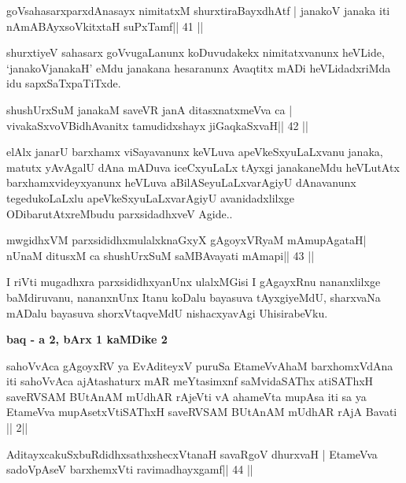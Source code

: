 \begin{shl}
goVsahasarxparxdAnasayx nimitatxM shurxtiraBayxdhAtf |
janakoV janaka iti nAmABAyxsoVkitxtaH suPxTamf\hfill || 41 ||
\end{shl}

\begin{artha}
shurxtiyeV sahasarx goVvugaLanunx koDuvudakekx nimitatxvanunx heVLide, 
`janakoVjanakaH' eMdu janakana hesaranunx Avaqtitx mADi heVLidadxriMda idu sapxSaTxpaTiTxde.
\end{artha}

\begin{shl}
shushUrxSuM janakaM saveVR janA ditasxnatxmeVva ca |
vivakaSxvoV\s BidhAvanitx tamudidxshayx jiGaqkaSxvaH\hfill || 42 ||
\end{shl}

\begin{artha}
elAlx janarU barxhamx viSayavanunx keVLuva apeVkeSxyuLaLxvanu janaka, matutx yAvAgalU dAna mADuva iceCxyuLaLx tAyxgi janakaneMdu heVLutAtx barxhamxvideyxyanunx heVLuva aBilASeyuLaLxvarAgiyU dAnavanunx tegedukoLaLxlu apeVkeSxyuLaLxvarAgiyU avanidadxlilxge ODibarutAtxreMbudu parxsidadhxveV Agide..
\end{artha}

\begin{shl}
mwgidhxVM parxsididhxmulalxknaGxyX gAgoyxVR\s yaM mAmupAgataH|
nUnaM ditusxM ca shushUrxSuM saMBAvayati mAmapi\hfill || 43 ||
\end{shl}

\begin{artha}
I riVti mugadhxra parxsididhxyanUnx ulalxMGisi I gAgayxRnu nananxlilxge baMdiruvanu, nananxnUnx Itanu koDalu bayasuva tAyxgiyeMdU, sharxvaNa mADalu bayasuva shorxVtaqveMdU nishacxyavAgi UhisirabeVku.
\end{artha}

\begin{center}
{\bf baq - a 2, bArx 1 kaMDike 2}
\end{center}

\begin{shl}
sahoVvAca gAgoyxRV ya EvA\s diteyxV puruSa
EtameVvAhaM barxhomxVdAna iti sahoVvAca
ajAtashaturx mAR meYtasimxnf saMvidaSAThx atiSAThxH
saveRVSAM BUtAnAM mUdhAR rAjeVti vA
ahameVta mupAsa iti sa ya EtameVva
mupAsetxV\s tiSAThxH saveRVSAM BUtAnAM mUdhAR
rAjA Bavati || 2||
\end{shl}


\begin{shl}
AditayxcakuSxbuRdidhxsathxshecxVtanaH savaRgoV dhurxvaH |
EtameVva sadoVpAseV barxhemxVti ravimadhayxgamf\hfill || 44 ||
\end{shl}


